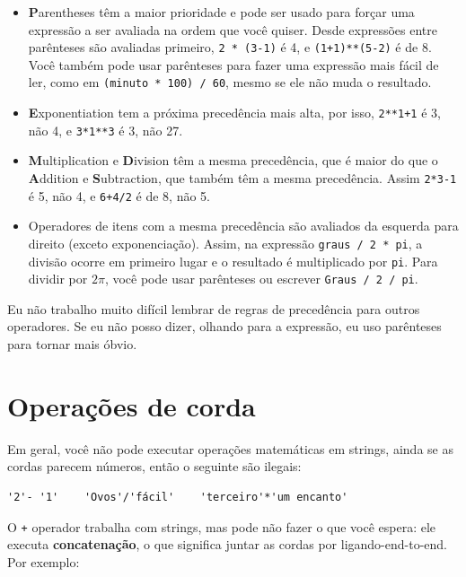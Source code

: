 \documentclass[10pt]{book}
\begin{document}
\begin{itemize}

\item{\bf P}arentheses têm a maior prioridade e pode ser usado 
para forçar uma expressão a ser avaliada na ordem que você quiser. Desde
expressões entre parênteses são avaliadas primeiro, {\tt 2 * (3-1)} é 4,
e {\tt (1+1)**(5-2)} é de 8. Você também pode usar parênteses para fazer uma
expressão mais fácil de ler, como em {\tt (minuto * 100) / 60}, mesmo
se ele não muda o resultado.

\item{\bf E}xponentiation tem a próxima precedência mais alta, por isso,
{\tt 2**1+1} é 3, não 4, e {\tt 3*1**3} é 3, não 27.

\item{\bf M}ultiplication e {\bf D}ivision têm a mesma precedência,
que é maior do que o {\bf A}ddition e {\bf S}ubtraction, que também
têm a mesma precedência. Assim {\tt 2*3-1} é 5, não 4, e
{\tt 6+4/2} é de 8, não 5.

\item Operadores de itens com a mesma precedência são avaliados da esquerda para
  direito (exceto exponenciação). Assim, na expressão {\tt graus /
    2 * pi}, a divisão ocorre em primeiro lugar e o resultado é multiplicado
  por {\tt pi}. Para dividir por $2 \pi$, você pode usar parênteses ou escrever
  {\tt Graus / 2 / pi}.

\end{itemize}

Eu não trabalho muito difícil lembrar de regras de precedência para outros
operadores. Se eu não posso dizer, olhando para a expressão, eu uso
parênteses para tornar mais óbvio.

\section{Operações de corda}

Em geral, você não pode executar operações matemáticas em strings, ainda
se as cordas parecem números, então o seguinte são ilegais:

\begin{verbatim}
'2'- '1'    'Ovos'/'fácil'    'terceiro'*'um encanto'
\end{verbatim}
%
O {\tt +} operador trabalha com strings, mas
pode não fazer o que você espera: ele executa
{\bf concatenação}, o que significa juntar as cordas por
ligando-end-to-end. Por exemplo:
\end{document}

